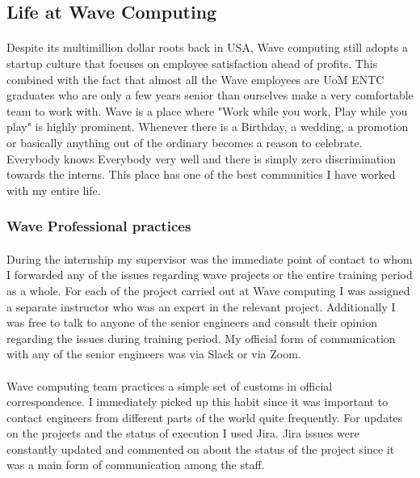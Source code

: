 
\newpage
\subsection{Life at Wave Computing}
\label{sec:wavelife}
\paragraph{}
Despite its multimillion dollar roots back in USA, Wave computing still adopts a startup culture that focuses on employee satisfaction ahead of profits. This combined with the fact that almost all the Wave employees are UoM ENTC graduates who are only a few years senior than ourselves make a very comfortable team to work with. Wave is a place where "Work while you work, Play while you play" is highly prominent. Whenever there is a Birthday, a wedding, a promotion or basically anything out of the ordinary becomes a reason to celebrate. Everybody knows Everybody very well and there is simply zero discrimination towards the interns. This place has one of the best communities I have worked with my entire life.

\subsubsection{Wave Professional practices}
\paragraph{}
During the internship my supervisor was the immediate point of contact to whom I forwarded any of the issues regarding wave projects or the entire training period as a whole. For each of the project carried out at Wave computing I was assigned a separate instructor who was an expert in the relevant project. Additionally I was free to talk to anyone of the senior engineers and consult their opinion regarding the issues during training period. My official form of communication with any of the senior engineers was via Slack or via Zoom. 

\paragraph{}
Wave computing team practices a simple set of customs in official correspondence. I immediately picked up this habit since it was important to contact engineers from different parts of the world quite frequently. For updates on the projects and the status of execution I used Jira. Jira issues were constantly updated and commented on about the status of the project since it was a main form of communication among the staff. 

